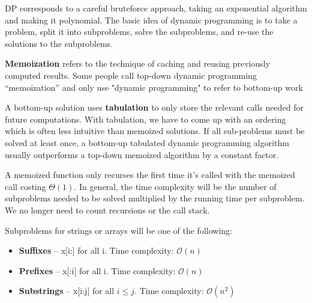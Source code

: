 \documentclass{article}
\newcommand{\bigO}{\mathcal{O}}
\begin{document}
    DP corresponds to a careful bruteforce approach, taking an exponential algorithm and making it polynomial. The basic idea of dynamic programming is to take a problem, split it into subproblems, solve the subproblems, and re-use the solutions to the subproblems.

    \textbf{Memoization} refers to the technique of caching and reusing previously computed results. Some people call top-down dynamic programming ``memoization'' and only use "dynamic programming" to refer to bottom-up work
    
    A bottom-up solution uses \textbf{tabulation} to only store the relevant calls needed for future computations. With tabulation, we have to come up with an ordering which is often less intuitive than memoized solutions. If all sub-problems must be solved at least once, a bottom-up tabulated dynamic programming algorithm usually outperforms a top-down memoized algorithm by a constant factor.

    A memoized function only recurses the first time it's called with the memoized call costing $\Theta(1)$. In general, the time complexity will be the number of subproblems needed to be solved multiplied by the running time per subproblem. We no longer need to count recursions or the call stack.
    
    
    
    Subproblems for strings or arrays will be one of the following:
    \begin{itemize}
        \item \textbf{Suffixes} -- x[i:] for all i. Time complexity: $\bigO(n)$
        \item \textbf{Prefixes} -- x[:i] for all i. Time complexity: $\bigO(n)$
        \item \textbf{Substrings} -- x[i:j] for all $i \leq j$. Time complexity: $\bigO(n^2)$
    \end{itemize}
    
\end{document}
